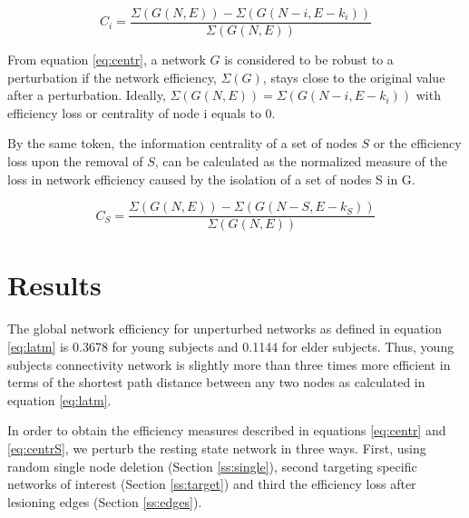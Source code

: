 \documentclass[12pt,a4paper]{article}
\begin{document}
\begin{equation}
C_i=\frac {\Sigma(G(N,E)) - \Sigma(G(N-i,E-k_i))} {\Sigma(G(N,E))} 
\label{eq:centr}
\end{equation}

From equation \ref{eq:centr}, a network $G$ is considered to be robust to
a perturbation if the network efficiency, $\Sigma(G)$, 
stays close to the original value after a perturbation. Ideally, $\Sigma(G(N,E)) = \Sigma(G(N -i,E-k_i))$
with efficiency loss or centrality of node i equals to 0.

By the same token, the information centrality of a set of nodes $S$ or the efficiency loss upon the removal of $S$, can be calculated as the normalized measure of the loss in network efficiency caused by the isolation of a set of nodes S in G.

\begin{equation}
C_S=\frac {\Sigma(G(N,E)) - \Sigma(G(N-S,E-k_S)) } {\Sigma(G(N,E))} 
\label{eq:centrS}
\end{equation}

\section{Results}
\label{results}

 The global network efficiency for unperturbed networks as defined in equation \ref{eq:latm} is
 0.3678 for young subjects and 0.1144 for elder subjects. Thus, young subjects connectivity network is slightly more than three times more efficient in terms of the shortest path distance between any two nodes as calculated in equation \ref{eq:latm}.

In order to obtain the efficiency measures described in equations \ref{eq:centr} and \ref{eq:centrS}, we perturb the resting state network in three ways. First, using random single node deletion (Section \ref{ss:single}),  second targeting specific networks of interest (Section \ref{ss:target}) and third the efficiency loss after lesioning edges (Section \ref{ss:edges}). 
\end{document}
